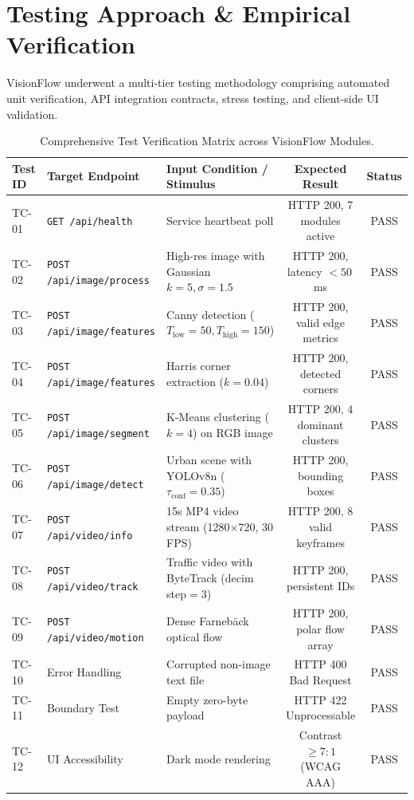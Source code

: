 \documentclass[12pt,a4paper]{article}
\begin{document}
\section{Testing Approach \& Empirical Verification}
VisionFlow underwent a multi-tier testing methodology comprising automated unit verification, API integration contracts, stress testing, and client-side UI validation.

\begin{table}[htbp]
\centering
\small
\caption{Comprehensive Test Verification Matrix across VisionFlow Modules.}
\begin{tabular}{lllcc}
\toprule
\textbf{Test ID} & \textbf{Target Endpoint} & \textbf{Input Condition / Stimulus} & \textbf{Expected Result} & \textbf{Status} \\
\midrule
TC-01 & \texttt{GET /api/health} & Service heartbeat poll & HTTP 200, 7 modules active & PASS \\
TC-02 & \texttt{POST /api/image/process} & High-res image with Gaussian $k=5, \sigma=1.5$ & HTTP 200, latency $< 50$\,ms & PASS \\
TC-03 & \texttt{POST /api/image/features} & Canny detection ($T_{\text{low}}=50, T_{\text{high}}=150$) & HTTP 200, valid edge metrics & PASS \\
TC-04 & \texttt{POST /api/image/features} & Harris corner extraction ($k=0.04$) & HTTP 200, detected corners & PASS \\
TC-05 & \texttt{POST /api/image/segment} & K-Means clustering ($k=4$) on RGB image & HTTP 200, 4 dominant clusters & PASS \\
TC-06 & \texttt{POST /api/image/detect} & Urban scene with YOLOv8n ($\tau_{\text{conf}}=0.35$) & HTTP 200, bounding boxes & PASS \\
TC-07 & \texttt{POST /api/video/info} & 15s MP4 video stream (1280$\times$720, 30 FPS) & HTTP 200, 8 valid keyframes & PASS \\
TC-08 & \texttt{POST /api/video/track} & Traffic video with ByteTrack (decim step$=3$) & HTTP 200, persistent IDs & PASS \\
TC-09 & \texttt{POST /api/video/motion} & Dense Farneb\"ack optical flow & HTTP 200, polar flow array & PASS \\
TC-10 & Error Handling & Corrupted non-image text file & HTTP 400 Bad Request & PASS \\
TC-11 & Boundary Test & Empty zero-byte payload & HTTP 422 Unprocessable & PASS \\
TC-12 & UI Accessibility & Dark mode rendering & Contrast $\ge 7:1$ (WCAG AAA) & PASS \\
\bottomrule
\end{tabular}
\end{table}
\end{document}
